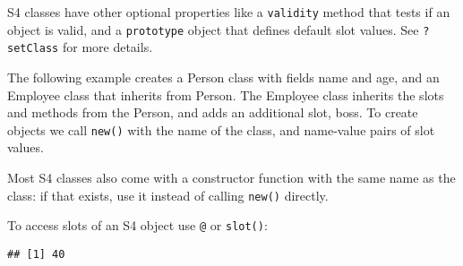 S4 classes have other optional properties like a \texttt{validity}
method that tests if an object is valid, and a \texttt{prototype} object
that defines default slot values. See \texttt{?setClass} for more
details.

The following example creates a Person class with fields name and age,
and an Employee class that inherits from Person. The Employee class
inherits the slots and methods from the Person, and adds an additional
slot, boss. To create objects we call \texttt{new()} with the name of
the class, and name-value pairs of slot values. 

\begin{Shaded}
\begin{Highlighting}[]
\NormalTok{(}\NormalTok{,}
   \NormalTok{(} \NormalTok{, } \NormalTok{))}
\NormalTok{(}\NormalTok{,}
   \NormalTok{(} \NormalTok{),}
   \NormalTok{)}

\StringTok{ }\NormalTok{(}\NormalTok{, } \NormalTok{, } \NormalTok{)}
\StringTok{ }\NormalTok{(}\NormalTok{, } \NormalTok{, } \NormalTok{, }
\end{Highlighting}
\end{Shaded}

Most S4 classes also come with a constructor function with the same name
as the class: if that exists, use it instead of calling \texttt{new()}
directly.

To access slots of an S4 object use \texttt{@} or \texttt{slot()}:
 

\begin{Shaded}
\begin{Highlighting}[]
\end{Highlighting}
\end{Shaded}

\begin{verbatim}
## [1] 40
\end{verbatim}

